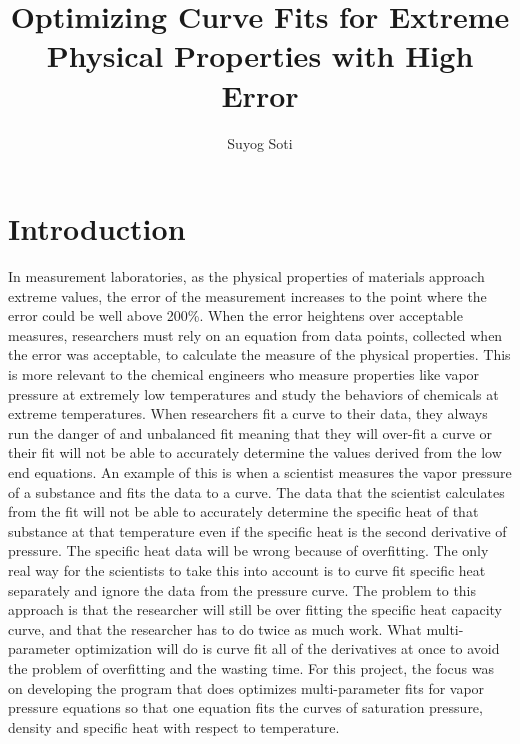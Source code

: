 \documentclass{article}
\title{Optimizing Curve Fits for Extreme Physical Properties with High Error \vspace{-2em}}
\date{\vspace{-2em}}%
\begin{document}
\begin{singlespacing}
\maketitle
\begin{center}
\author{Suyog Soti}
\end{center}
\section*{Introduction}
\indent In measurement laboratories, as the physical properties of materials approach extreme values, the error of the measurement increases to the point where the error could be well above 200\%. When the error heightens over acceptable measures, researchers must rely on an equation from data points, collected when the error was acceptable, to calculate the measure of the physical properties. This is more relevant to the chemical engineers who measure properties like vapor pressure at extremely low temperatures and study the behaviors of chemicals at extreme temperatures. When researchers fit a curve to their data, they always run the danger of and unbalanced fit meaning that they will over-fit a curve or their fit will not be able to accurately determine the values derived from the low end equations. An example of this is when a scientist measures the vapor pressure of a substance and fits the data to a curve. The data that the scientist calculates from the fit will not be able to accurately determine the specific heat of that substance at that temperature even if the specific heat is the second derivative of pressure. The specific heat data will be wrong because of overfitting. The only real way for the scientists to take this into account is to curve fit specific heat separately and ignore the data from the pressure curve. The problem to this approach is that the researcher will still be over fitting the specific heat capacity curve, and that the researcher has to do twice as much work. What multi-parameter optimization will do is curve fit all of the derivatives at once to avoid the problem of overfitting and the wasting time. For this project, the focus was on developing the program that does optimizes multi-parameter fits for vapor pressure equations so that one equation fits the curves of saturation pressure, density and specific heat with respect to temperature.


\end{singlespacing}
\end{document}
